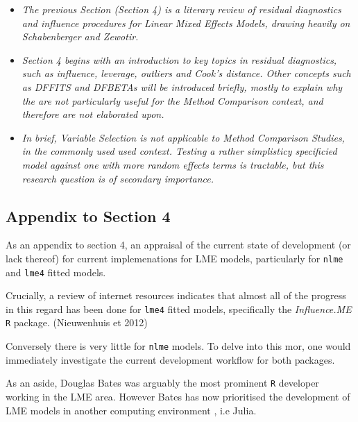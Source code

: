 \documentclass[12pt, a4paper]{report}
\theoremstyle{plain}
\theoremstyle{definition}
\theoremstyle{remark}
\begin{document}
\newpage
\begin{itemize}
\item \textit{
	The previous Section (Section 4) is a literary review of residual diagnostics and influence procedures
	for Linear Mixed Effects Models, drawing heavily on Schabenberger and Zewotir.}
	
\item \textit{	Section 4 begins with an introduction to key topics in residual diagnostics, such as influence, leverage, outliers
	and Cook's distance. Other concepts such as DFFITS and DFBETAs will be introduced briefly, mostly to explain why the are not particularly useful for
	the Method Comparison context, and therefore are not elaborated upon.}
	
\item \textit{	In brief, Variable Selection is not applicable to Method Comparison Studies, in the 
	commonly used used context. 
	Testing a rather simplisticy specificied model against one with more random effects terms is tractable, but this research question is of secondary importance.}
\end{itemize}

\newpage
\subsection*{Appendix to Section 4}

As an appendix to section 4, an appraisal of the current state of development (or lack thereof) for current implemenations for LME models, particularly for
\texttt{nlme} and \texttt{lme4} fitted models.

Crucially, a review of internet resources indicates that almost all of the progress in this regard has been done for \texttt{lme4} fitted models, specifically the \textit{Influence.ME} \texttt{R} package. (Nieuwenhuis et 2012)

Conversely there is very little for \texttt{nlme} models. To delve into this mor, one would immediately investigate the current development workflow for both packages.


As an aside, Douglas Bates was arguably the most prominent \texttt{R} developer working in the LME area. 
However Bates has now prioritised the development of LME models in another computing environment , i.e Julia. 
\end{document}
